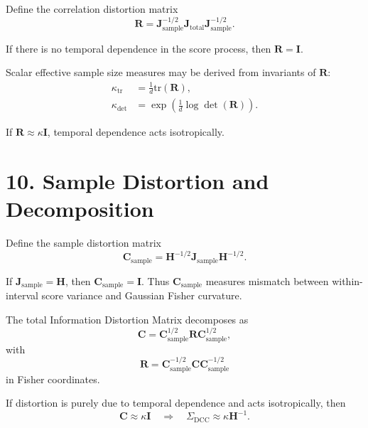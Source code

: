 \documentclass[11pt]{article}
\begin{document}
Define the correlation distortion matrix
\begin{equation}
\mathbf R
=
\mathbf J_{\mathrm{sample}}^{-1/2}
\mathbf J_{\mathrm{total}}
\mathbf J_{\mathrm{sample}}^{-1/2}.
\end{equation}

If there is no temporal dependence in the score process, then $\mathbf R = \mathbf I$.

Scalar effective sample size measures may be derived from invariants of $\mathbf R$:
\begin{align}
\kappa_{\mathrm{tr}} &= \frac{1}{d}\mathrm{tr}(\mathbf R), \\
\kappa_{\mathrm{det}} &= \exp\!\left(\frac{1}{d}\log\det(\mathbf R)\right).
\end{align}

If $\mathbf R \approx \kappa \mathbf I$, temporal dependence acts isotropically.

\section*{10. Sample Distortion and Decomposition}

Define the sample distortion matrix
\begin{equation}
\mathbf C_{\mathrm{sample}}
=
\mathbf H^{-1/2}
\mathbf J_{\mathrm{sample}}
\mathbf H^{-1/2}.
\end{equation}

If $\mathbf J_{\mathrm{sample}} = \mathbf H$, then $\mathbf C_{\mathrm{sample}} = \mathbf I$.
Thus $\mathbf C_{\mathrm{sample}}$ measures mismatch between within-interval score variance and Gaussian Fisher curvature.

The total Information Distortion Matrix decomposes as
\begin{equation}
\mathbf C
=
\mathbf C_{\mathrm{sample}}^{1/2}
\mathbf R
\mathbf C_{\mathrm{sample}}^{1/2},
\end{equation}
with
\begin{equation}
\mathbf R
=
\mathbf C_{\mathrm{sample}}^{-1/2}
\mathbf C
\mathbf C_{\mathrm{sample}}^{-1/2}
\end{equation}
in Fisher coordinates.

If distortion is purely due to temporal dependence and acts isotropically, then
\begin{equation}
\mathbf C \approx \kappa \mathbf I
\quad \Rightarrow \quad
\Sigma_{\mathrm{DCC}} \approx \kappa \mathbf H^{-1}.
\end{equation}
\end{document}
